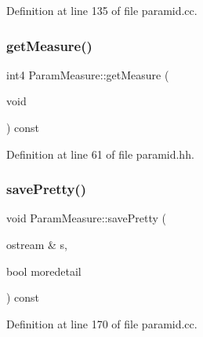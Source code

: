 Definition at line 135 of file paramid.\+cc.

\mbox{\label{class_param_measure_a225033f51cfb4efe11c15e500de4217f}} 
\subsubsection{\texorpdfstring{getMeasure()}{getMeasure()}}
{\footnotesize\ttfamily int4 Param\+Measure\+::get\+Measure (\begin{DoxyParamCaption}\item[{void}]{ }\end{DoxyParamCaption}) const\hspace{0.3cm}{\ttfamily [inline]}}



Definition at line 61 of file paramid.\+hh.

\mbox{\label{class_param_measure_a3f7a68d5a3978a999dd0690308710655}} 
\subsubsection{\texorpdfstring{savePretty()}{savePretty()}}
{\footnotesize\ttfamily void Param\+Measure\+::save\+Pretty (\begin{DoxyParamCaption}\item[{ostream \&}]{s,  }\item[{bool}]{moredetail }\end{DoxyParamCaption}) const}



Definition at line 170 of file paramid.\+cc.

